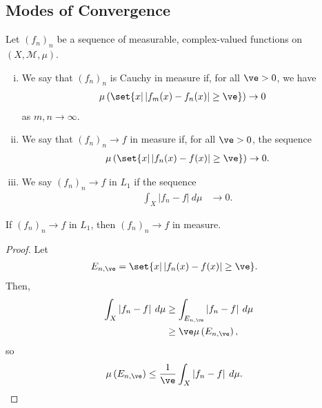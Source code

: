 \documentclass[10pt]{mypackage}
\begin{document}
\subsection{Modes of Convergence}%
\begin{definition}\hfill
  Let $\left( f_n \right)_n$ be a sequence of measurable, complex-valued functions on $\left( X,\mathcal{M},\mu \right)$. 
  \begin{enumerate}[(i)]
    \item We say that $\left( f_n \right)_n$ is Cauchy in measure if, for all $\ve > 0$, we have
      \begin{align*}
        \mu\left( \set{x | \left\vert f_m(x)-f_n(x) \right\vert\geq \ve} \right) &\rightarrow 0
      \end{align*}
      as $m,n\rightarrow\infty$.
    \item We say that $\left( f_n \right)_n\rightarrow f$ in measure if, for all $\ve > 0$, the sequence
      \begin{align*}
        \mu\left( \set{x | \left\vert f_n(x)-f(x) \right\vert \geq \ve} \right) \rightarrow 0.
      \end{align*}
    \item We say $\left( f_n \right)_n\rightarrow f$ in $L_1$ if the sequence
      \begin{align*}
        \int_{X}^{} \left\vert f_n-f \right\vert\:d\mu &\rightarrow 0.
      \end{align*}
  \end{enumerate}
\end{definition}
\begin{proposition}
  If $\left( f_n \right)_n\rightarrow f$ in $L_1$, then $\left( f_n \right)_n\rightarrow f$ in measure.
\end{proposition}
\begin{proof}
  Let
  \begin{align*}
    E_{n,\ve} &= \set{x | \left\vert f_n(x) - f(x) \right\vert \geq \ve}.
  \end{align*}
  Then,
  \begin{align*}
    \int_{X}^{} \left\vert f_n-f \right\vert\:d\mu &\geq \int_{E_{n,\ve}}^{} \left\vert f_n-f \right\vert\:d\mu\\
                                                   &\geq \ve \mu\left( E_{n,\ve} \right),
  \end{align*}
  so
  \begin{align*}
    \mu\left( E_{n,\ve} \right) &\leq \frac{1}{\ve} \int_{X}^{} \left\vert f_n-f \right\vert\:d\mu.
  \end{align*}
\end{proof}
\end{document}
